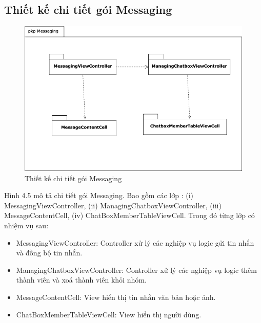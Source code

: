 \documentclass[../DoAn.tex]{subfiles}
\begin{document}
\subsection{Thiết kế chi tiết gói Messaging} 
\begin{figure}[H]
    \centering
    \includegraphics[width=0.9\linewidth]{Hinhve/Package/Messaging_Package_Detail.png}
    \caption{Thiết kế chi tiết gói Messaging}
    \label{fig:use_case_tổng_quan}
\end{figure}
Hình 4.5 mô tả chi tiết gói Messaging. Bao gồm các lớp : (i) MessagingViewController, (ii) ManagingChatboxViewController, (iii) MessageContentCell, (iv) ChatBoxMemberTableViewCell. Trong đó từng lớp có nhiệm vụ sau:
\begin{itemize}
    \item MessagingViewController: Controller xử lý các nghiệp vụ logic gửi tin nhắn và đồng bộ tin nhắn.
    \item ManagingChatboxViewController: Controller xử lý các nghiệp vụ logic thêm thành viên và xoá thành viên khỏi nhóm.
    \item MessageContentCell: View hiển thị tin nhắn văn bản hoặc ảnh.
    \item ChatBoxMemberTableViewCell: View hiển thị người dùng.
\end{itemize} \newpage
\end{document}

